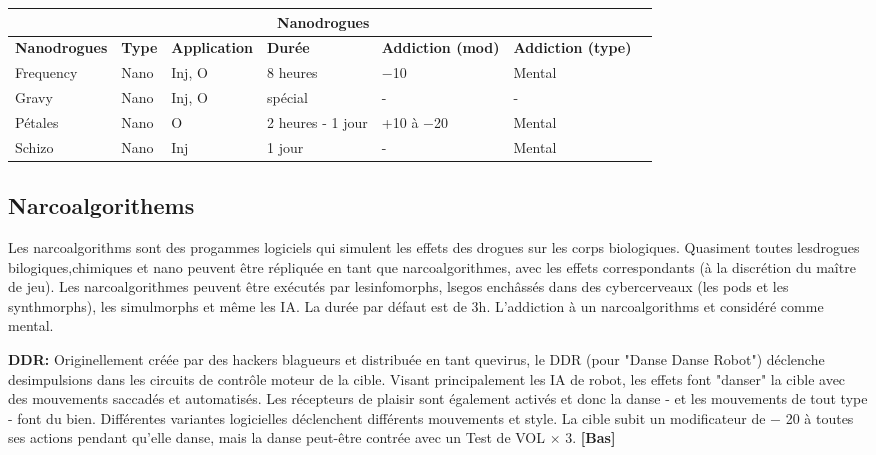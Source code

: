 \hspace{1cm} 

\begin{tabular}{|l|l|l|l|l|l|l|} \hline

\multicolumn{6}{|c|}{\textbf{Nanodrogues}}	\\ \hline

\textbf{Nanodrogues}	&\textbf{Type}	&\textbf{Application}	&\textbf{Durée}	&\textbf{Addiction (mod)}	&\textbf{Addiction (type)} \\ \hline

Frequency	&Nano	&Inj, O	&8 heures &$-$10	&Mental \\ \hline

Gravy	&Nano	&Inj, O	&spécial &- &- \\ \hline

Pétales	&Nano	&O	&2 heures - 1 jour	&+10 à $-$20	&Mental \\ \hline

Schizo	&Nano	&Inj	&1 jour	&- &Mental \\ \hline

\end{tabular} \label{tab:nanodrugs} 

\subsection{Narcoalgorithems} \label{sec:narcoalgorithms} 

Les narcoalgorithms sont des progammes logiciels qui simulent les effets des drogues sur les corps biologiques. Quasiment toutes lesdrogues bilogiques,chimiques et nano peuvent être répliquée en tant que narcoalgorithmes, avec les effets correspondants (à la discrétion du maître de jeu). Les narcoalgorithmes peuvent être exécutés par lesinfomorphs, lsegos enchâssés dans des cybercerveaux (les pods et les synthmorphs), les simulmorphs et même les IA. 
La durée par défaut est de 3h. L'addiction à un narcoalgorithms et considéré comme mental.

\textbf{DDR:} Originellement créée par des hackers blagueurs et distribuée en tant quevirus, le DDR (pour "Danse Danse Robot") déclenche desimpulsions dans les circuits de contrôle moteur de la cible. Visant principalement les IA de robot, les effets font "danser" la cible avec des mouvements saccadés et automatisés. Les récepteurs de plaisir sont également activés et donc la danse - et les mouvements de tout type - font du bien. Différentes variantes logicielles déclenchent différents mouvements et style. La cible subit un modificateur de $-$ 20 à toutes ses actions pendant qu'elle danse, mais la danse peut-être contrée avec un Test de VOL $\times$ 3. \textbf{[Bas]} 

